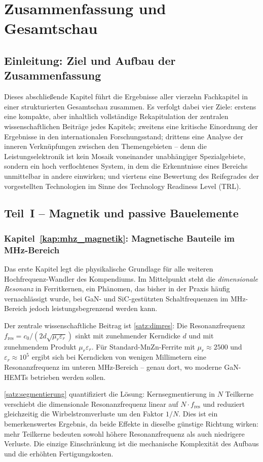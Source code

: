 ﻿\documentclass[a4paper,12pt,openany,oneside]{book}
\newcommand{\abschnitt}[1]{\section{#1}}
\newcommand{\unterabschnitt}[1]{\subsection{#1}}
\theoremstyle{definition}
\begin{document}
\chapter{Zusammenfassung und Gesamtschau}
\label{kap:zusammenfassung}

\abschnitt{Einleitung: Ziel und Aufbau der Zusammenfassung}

Dieses abschlie\ss{}ende Kapitel f\"uhrt die Ergebnisse aller vierzehn Fachkapitel in
einer strukturierten Gesamtschau zusammen. Es verfolgt dabei vier Ziele: erstens eine
kompakte, aber inhaltlich vollst\"andige Rekapitulation der zentralen wissenschaftlichen
Beitr\"age jedes Kapitels; zweitens eine kritische Einordnung der Ergebnisse in den
internationalen Forschungsstand; drittens eine Analyse der inneren Verkn\"upfungen
zwischen den Themengebieten -- denn die Leistungselektronik ist kein Mosaik voneinander
unabh\"angiger Spezialgebiete, sondern ein hoch verflochtenes System, in dem die
Erkenntnisse eines Bereichs unmittelbar in andere einwirken; und viertens eine Bewertung
des Reifegrades der vorgestellten Technologien im Sinne des Technology Readiness Level
(TRL).

\abschnitt{Teil~I -- Magnetik und passive Bauelemente}

\unterabschnitt{Kapitel~\ref{kap:mhz_magnetik}: Magnetische Bauteile im MHz-Bereich}

Das erste Kapitel legt die physikalische Grundlage f\"ur alle weiteren Hochfrequenz-Wandler
des Kompendiums. Im Mittelpunkt steht die \emph{dimensionale Resonanz} in Ferritkernen,
ein Ph\"anomen, das bisher in der Praxis h\"aufig vernachl\"assigt wurde, bei
GaN- und SiC-gest\"utzten Schaltfrequenzen im MHz-Bereich jedoch leistungsbegrenzend
werden kann.

Der zentrale wissenschaftliche Beitrag ist \autoref{satz:dimres}: Die Resonanzfrequenz
$f_\mathrm{res} = c_0 / (2d\sqrt{\mu_r\varepsilon_r})$ sinkt mit zunehmender Kerndicke $d$
und mit zunehmendem Produkt $\mu_r \varepsilon_r$. F\"ur Standard-MnZn-Ferrite mit
$\mu_r \approx 2500$ und $\varepsilon_r \approx 10^5$ ergibt sich bei Kerndicken von
wenigen Millimetern eine Resonanzfrequenz im unteren MHz-Bereich -- genau dort, wo
moderne GaN-HEMTs betrieben werden sollen.

\autoref{satz:segmentierung} quantifiziert die L\"osung: Kernsegmentierung in $N$ Teilkerne
verschiebt die dimensionale Resonanzfrequenz linear auf $N \cdot f_\mathrm{res}$ und
reduziert gleichzeitig die Wirbelstromverluste um den Faktor $1/N$. Dies ist ein
bemerkenswertes Ergebnis, da beide Effekte in dieselbe g\"unstige Richtung wirken:
mehr Teilkerne bedeuten sowohl h\"ohere Resonanzfrequenz als auch niedrigere Verluste.
Die einzige Einschr\"ankung ist die mechanische Komplexit\"at des Aufbaus und die
erh\"ohten Fertigungskosten.
\end{document}
